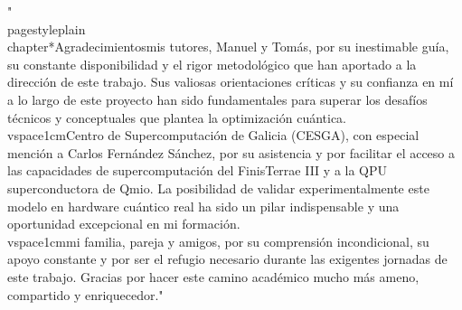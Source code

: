 "\\pagestyle{plain}\n\\chapter*{Agradecimientos}\n\nA mis tutores, Manuel y Tomás, por su inestimable guía, su constante disponibilidad y el rigor metodológico que han aportado a la dirección de este trabajo. Sus valiosas orientaciones críticas y su confianza en mí a lo largo de este proyecto han sido fundamentales para superar los desafíos técnicos y conceptuales que plantea la optimización cuántica.\n\n\\vspace{1cm}\nAl Centro de Supercomputación de Galicia (CESGA), con especial mención a Carlos Fernández Sánchez, por su asistencia y por facilitar el acceso a las capacidades de supercomputación del FinisTerrae III y a la QPU superconductora de Qmio. La posibilidad de validar experimentalmente este modelo en hardware cuántico real ha sido un pilar indispensable y una oportunidad excepcional en mi formación.\n\n\\vspace{1cm}\nA mi familia, pareja y amigos, por su comprensión incondicional, su apoyo constante y por ser el refugio necesario durante las exigentes jornadas de este trabajo. Gracias por hacer este camino académico mucho más ameno, compartido y enriquecedor.\n"